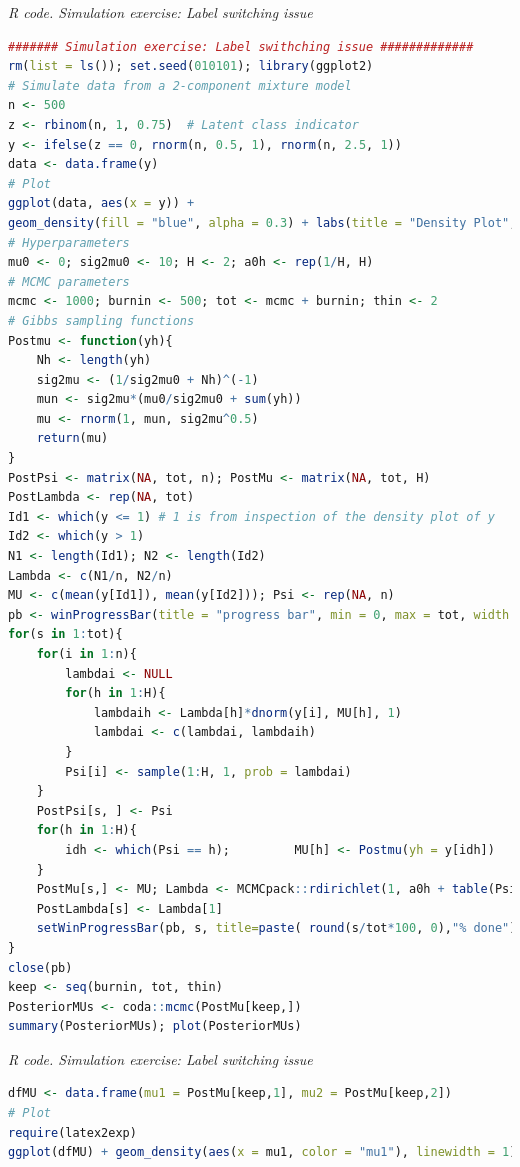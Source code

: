 \begin{tcolorbox}[enhanced,width=4.67in,center upper,
	fontupper=\large\bfseries,drop shadow southwest,sharp corners]
	\textit{R code. Simulation exercise: Label switching issue}
	\begin{VF}
		\begin{lstlisting}[language=R]
			####### Simulation exercise: Label swithching issue #############
rm(list = ls()); set.seed(010101); library(ggplot2)
# Simulate data from a 2-component mixture model
n <- 500
z <- rbinom(n, 1, 0.75)  # Latent class indicator
y <- ifelse(z == 0, rnorm(n, 0.5, 1), rnorm(n, 2.5, 1))
data <- data.frame(y)
# Plot
ggplot(data, aes(x = y)) +
geom_density(fill = "blue", alpha = 0.3) + labs(title = "Density Plot", x = "y", y = "Density") + theme_minimal()
# Hyperparameters
mu0 <- 0; sig2mu0 <- 10; H <- 2; a0h <- rep(1/H, H)
# MCMC parameters
mcmc <- 1000; burnin <- 500; tot <- mcmc + burnin; thin <- 2
# Gibbs sampling functions
Postmu <- function(yh){
	Nh <- length(yh)
	sig2mu <- (1/sig2mu0 + Nh)^(-1)
	mun <- sig2mu*(mu0/sig2mu0 + sum(yh))
	mu <- rnorm(1, mun, sig2mu^0.5)
	return(mu)
}
PostPsi <- matrix(NA, tot, n); PostMu <- matrix(NA, tot, H)
PostLambda <- rep(NA, tot)
Id1 <- which(y <= 1) # 1 is from inspection of the density plot of y 
Id2 <- which(y > 1)
N1 <- length(Id1); N2 <- length(Id2)
Lambda <- c(N1/n, N2/n)
MU <- c(mean(y[Id1]), mean(y[Id2])); Psi <- rep(NA, n)
pb <- winProgressBar(title = "progress bar", min = 0, max = tot, width = 300)
for(s in 1:tot){
	for(i in 1:n){
		lambdai <- NULL
		for(h in 1:H){
			lambdaih <- Lambda[h]*dnorm(y[i], MU[h], 1)
			lambdai <- c(lambdai, lambdaih)
		}
		Psi[i] <- sample(1:H, 1, prob = lambdai)
	}
	PostPsi[s, ] <- Psi
	for(h in 1:H){
		idh <- which(Psi == h); 		MU[h] <- Postmu(yh = y[idh])
	}
	PostMu[s,] <- MU; Lambda <- MCMCpack::rdirichlet(1, a0h + table(Psi))
	PostLambda[s] <- Lambda[1]
	setWinProgressBar(pb, s, title=paste( round(s/tot*100, 0),"% done"))
}
close(pb)
keep <- seq(burnin, tot, thin)
PosteriorMUs <- coda::mcmc(PostMu[keep,])
summary(PosteriorMUs); plot(PosteriorMUs)
\end{lstlisting}
	\end{VF}
\end{tcolorbox}
 
\begin{tcolorbox}[enhanced,width=4.67in,center upper,
	fontupper=\large\bfseries,drop shadow southwest,sharp corners]
	\textit{R code. Simulation exercise: Label switching issue}
	\begin{VF}
		\begin{lstlisting}[language=R]
dfMU <- data.frame(mu1 = PostMu[keep,1], mu2 = PostMu[keep,2])
# Plot
require(latex2exp)
ggplot(dfMU) + geom_density(aes(x = mu1, color = "mu1"), linewidth = 1) + geom_density(aes(x = mu2, color = "mu2"), linewidth = 1) + labs(title = "Density Plot", x = TeX("$\\mu$"), y = "Density", color = "Variable") + theme_minimal() + scale_color_manual(values = c("mu1" = "blue", "mu2" = "red"))
\end{lstlisting}
	\end{VF}
\end{tcolorbox}

